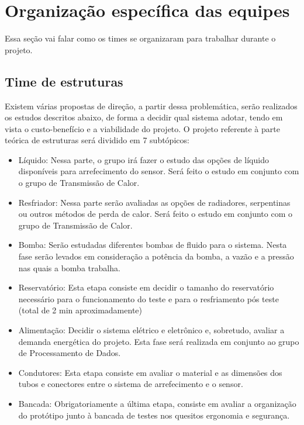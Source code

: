 \section{Organização específica das equipes}

Essa seção vai falar como os times se organizaram para trabalhar durante o projeto.

\subsection{Time de estruturas}

Existem várias propostas de direção, a partir dessa problemática, serão realizados os estudos descritos abaixo, de forma a decidir qual sistema adotar, tendo em vista o custo-benefício e a viabilidade do projeto.
O projeto referente à parte teórica de estruturas será dividido em 7 subtópicos:

\begin{itemize}
\item Líquido: Nessa parte, o grupo irá fazer o estudo das opções de líquido disponíveis para arrefecimento do sensor. Será feito o estudo em conjunto com o grupo de Transmissão de Calor.
\item Resfriador: Nessa parte serão avaliadas as opções de radiadores, serpentinas ou outros métodos de perda de calor. Será feito o estudo em conjunto com o grupo de Transmissão de Calor.
\item Bomba: Serão estudadas diferentes bombas de fluido para o sistema. Nesta fase serão levados em consideração a potência da bomba, a vazão e a pressão nas quais a bomba trabalha.
\item Reservatório: Esta etapa consiste em decidir o tamanho do reservatório necessário para o funcionamento do teste e para o resfriamento pós teste (total de 2 min aproximadamente)
\item Alimentação: Decidir o sistema elétrico e eletrônico e, sobretudo, avaliar a demanda energética do projeto. Esta fase será realizada em conjunto ao grupo de Processamento de Dados.
\item Condutores: Esta etapa consiste em avaliar o material e as dimensões dos tubos e conectores entre o sistema de arrefecimento e o sensor.
\item Bancada: Obrigatoriamente a última etapa, consiste em avaliar a organização do protótipo junto à bancada de testes nos quesitos ergonomia e segurança.
\end{itemize}

